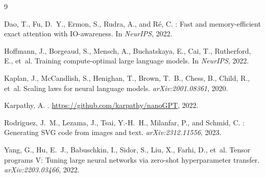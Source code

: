 \documentclass[11pt,a4paper]{article}
\begin{document}

\begin{thebibliography}{9}

Dao, T., Fu, D.~Y., Ermon, S., Rudra, A., and R{\'e}, C.
: Fast and memory-efficient exact attention with IO-awareness.
\newblock In \textit{NeurIPS}, 2022.

Hoffmann, J., Borgeaud, S., Mensch, A., Buchatskaya, E., Cai, T., Rutherford, E.,
  et~al.
\newblock Training compute-optimal large language models.
\newblock In \textit{NeurIPS}, 2022.

Kaplan, J., McCandlish, S., Henighan, T., Brown, T.~B., Chess, B., Child, R.,
  et~al.
\newblock Scaling laws for neural language models.
\newblock \textit{arXiv:2001.08361}, 2020.

Karpathy, A.
.
\newblock \url{https://github.com/karpathy/nanoGPT}, 2022.

Rodriguez, J.~M., Lezama, J., Tsai, Y.-H.~H., Milanfar, P., and Schmid, C.
: Generating {SVG} code from images and text.
\newblock \textit{arXiv:2312.11556}, 2023.

Yang, G., Hu, E.~J., Babuschkin, I., Sidor, S., Liu, X., Farhi, D., et~al.
\newblock Tensor programs {V}: Tuning large neural networks via zero-shot
  hyperparameter transfer.
\newblock \textit{arXiv:2203.03466}, 2022.

\end{thebibliography}
\end{document}
